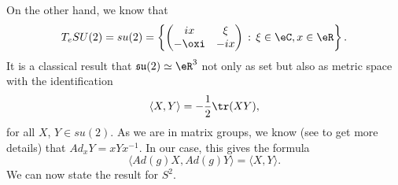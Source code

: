 On the other hand,  we know that
\begin{eqnarray}\label{explsu2} T_eSU(2)=su(2)=\left\{\begin{pmatrix}
ix & \xi \\
-\oxi & -ix
\end{pmatrix}\,:\,\xi\in\eC,x\in\eR\right\}.
\end{eqnarray}
 It is a classical result that $\mathfrak{su}(2)\simeq\eR^3$ not only as set but also as metric space with the identification
\[
\langle X,Y\rangle=-\frac{1}{2}\tr(XY),
\]
 for all $X$, $Y\in su(2)$. As we are in matrix groups, we know (see \cite{Lie} to get more details) that $Ad_xY=xYx^{-1}$. In our case, this gives the formula
\[
                \langle Ad(g)X,Ad(g)Y\rangle=\langle X,Y\rangle.
\]
We can now state the result for $S^2$.

